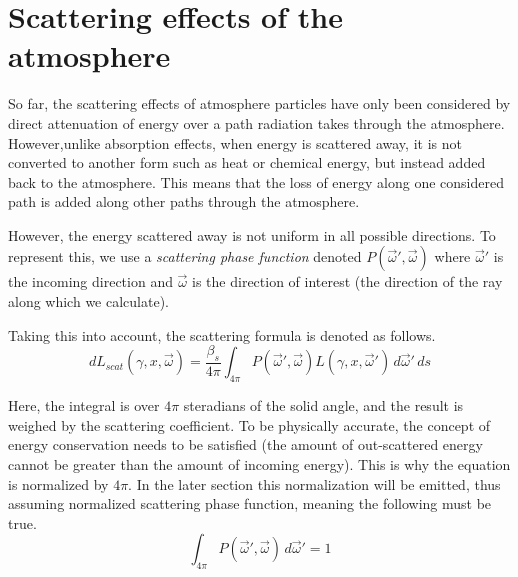 \documentclass{ctuthesis}
\begin{document}
\section{Scattering effects of the atmosphere}

So far, the scattering effects of atmosphere particles have only been considered by 
direct attenuation of energy over a path radiation takes through the atmosphere. However,unlike absorption effects, 
when energy is scattered away, it is not converted to another form such
as heat or chemical energy, but instead added back to the atmosphere. This means that the loss 
of energy along one considered path is added along other paths through the atmosphere.

However, the energy scattered away is not uniform in all possible directions. 
To represent this, we use a \textit{scattering phase function} denoted 
$P(\overrightarrow{\omega}',\overrightarrow{\omega})$ where $\overrightarrow{\omega}'$ is the
incoming direction and $\overrightarrow{\omega}$ is the direction of interest (the direction of the ray along which we calculate).

Taking this into account, the scattering formula is denoted as follows.
\begin{equation}
    d L_{scat}(\gamma, x, \overrightarrow{\omega}) = \frac{\beta_{s}}{4 \pi} \int_{4 \pi}
    P(\overrightarrow{\omega}',\overrightarrow{\omega}) L (\gamma, x, \overrightarrow{\omega}')
     \,d\overrightarrow{\omega}' \,ds
\end{equation}

Here, the integral is over $4 \pi$ steradians of the solid angle, and the result is weighed by the
scattering coefficient. To be physically accurate, the concept of energy conservation 
needs to be satisfied (the amount of out-scattered energy cannot be greater than the amount of
incoming energy). This is why the equation is normalized by $4 \pi$. In the later section this 
normalization will be emitted, thus assuming normalized scattering phase function, meaning the following 
must be true.
\begin{equation}
    \int_{4 \pi} P(\overrightarrow{\omega}',\overrightarrow{\omega})\,d\overrightarrow{\omega}' = 1
\end{equation}
\end{document}

